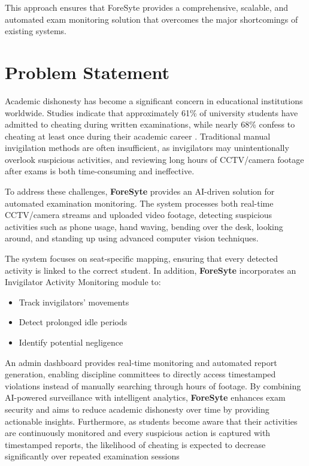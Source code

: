 This approach ensures that ForeSyte provides a comprehensive, scalable, and automated exam monitoring solution that overcomes the major shortcomings of existing systems.
\section{Problem Statement}

Academic dishonesty has become a significant concern in educational institutions worldwide. 
Studies indicate that approximately 61\% of university students have admitted to cheating during written examinations, 
while nearly 68\% confess to cheating at least once during their academic career \cite{bucciol2020cheating}. 
Traditional manual invigilation methods are often insufficient, as invigilators may unintentionally overlook suspicious activities, 
and reviewing long hours of CCTV/camera footage after exams is both time-consuming and ineffective.

To address these challenges, \textbf{ForeSyte} provides an AI-driven solution for automated examination monitoring. 
The system processes both real-time CCTV/camera streams and uploaded video footage, detecting suspicious activities such as 
phone usage, hand waving, bending over the desk, looking around, and standing up using advanced computer vision techniques.

The system focuses on seat-specific mapping, ensuring that every detected activity is linked to the correct student. 
In addition, \textbf{ForeSyte} incorporates an Invigilator Activity Monitoring module to:
\begin{itemize}[noitemsep, topsep=0pt]
    \item Track invigilators' movements
    \item Detect prolonged idle periods
    \item Identify potential negligence
\end{itemize}
An admin dashboard provides real-time monitoring and automated report generation, enabling discipline committees to 
directly access timestamped violations instead of manually searching through hours of footage. 
By combining AI-powered surveillance with intelligent analytics, \textbf{ForeSyte} enhances exam security and aims to 
reduce academic dishonesty over time by providing actionable insights. Furthermore, as students become aware that their activities 
are continuously monitored and every suspicious action is captured with timestamped reports, the likelihood of cheating 
is expected to decrease significantly over repeated examination sessions

